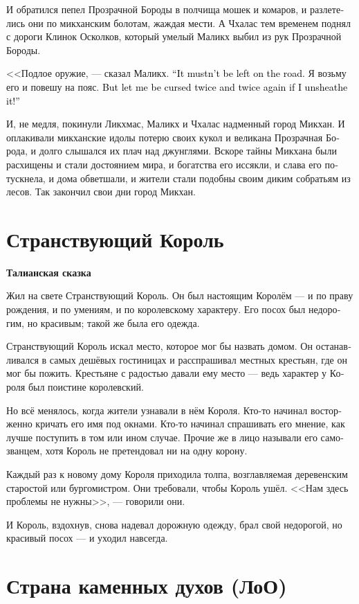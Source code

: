 \documentclass[a4paper,12pt,fleqn]{book}\usepackage{cooltooltips}\usepackage{polyglossia}\setdefaultlanguage[babelshorthands=true]{russian}\setotherlanguage{english}\defaultfontfeatures{Ligatures=TeX,Mapping=tex-text} \usepackage{xcolor}\definecolor{lightgray}{HTML}{bbbbbb}\color{lightgray}\newcommand{\ml}[3]{\textenglish{\textcolor{black}{#3}}}
\begin{document}
{И обратился пепел Прозрачной Бороды в полчища мошек и комаров, и разлетелись они по микханским болотам, жаждая мести.
А Чхалас тем временем поднял с дороги Клинок Осколков, который умелый Маликх выбил из рук Прозрачной Бороды.

<<Подлое оружие, --- сказал Маликх.
\ml{$0$}
{--- Нельзя оставлять на дороге такое.}
{``It mustn't be left on the road.}
Я возьму его и повешу на пояс.
\ml{$0$}
{Но будь я проклят четырежды четыре раза, если достану его из ножен!>>}
{But let me be cursed twice and twice again if I unsheathe it!''}

И, не медля, покинули Ликхмас, Маликх и Чхалас надменный город Микхан.
И оплакивали микханские идолы потерю своих кукол и великана Прозрачная Борода, и долго слышался их плач над джунглями.
Вскоре тайны Микхана были расхищены и стали достоянием мира, и богатства его иссякли, и слава его потускнела, и дома обветшали, и жители стали подобны своим диким собратьям из лесов.
Так закончил свои дни город Микхан.

\section{Странствующий Король}

\textbf{Талианская сказка}

Жил на свете Странствующий Король.
Он был настоящим Королём --- и по праву рождения, и по умениям, и по королевскому характеру.
Его посох был недорогим, но красивым;
такой же была его одежда.

Странствующий Король искал место, которое мог бы назвать домом.
Он останавливался в самых дешёвых гостиницах и расспрашивал местных крестьян, где он мог бы пожить.
Крестьяне с радостью давали ему место --- ведь характер у Короля был поистине королевский.

Но всё менялось, когда жители узнавали в нём Короля.
Кто-то начинал восторженно кричать его имя под окнами.
Кто-то начинал спрашивать его мнение, как лучше поступить в том или ином случае.
Прочие же в лицо называли его самозванцем, хотя Король не претендовал ни на одну корону.

Каждый раз к новому дому Короля приходила толпа, возглавляемая деревенским старостой или бургомистром.
Они требовали, чтобы Король ушёл.
<<Нам здесь проблемы не нужны>>, --- говорили они.

И Король, вздохнув, снова надевал дорожную одежду, брал свой недорогой, но красивый посох --- и уходил навсегда.

\section{Страна каменных духов (ЛоО)}

}
\end{document}
